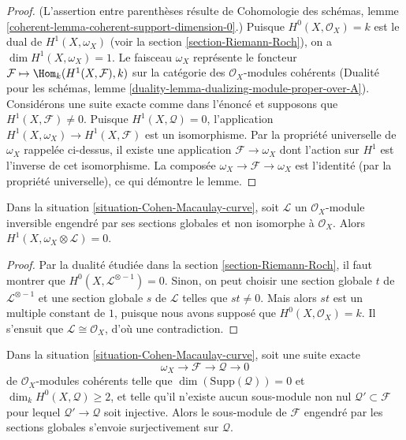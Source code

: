 \begin{proof}
(L'assertion entre parenthèses résulte de Cohomologie des schémas, lemme \ref{coherent-lemma-coherent-support-dimension-0}.) Puisque $H^0(X, \mathcal{O}_X) = k$ est le dual de $H^1(X, \omega_X)$ (voir la section \ref{section-Riemann-Roch}), on a $\dim H^1(X, \omega_X) = 1$. Le faisceau $\omega_X$ représente le foncteur $\mathcal{F} \mapsto \Hom_k(H^1(X, \mathcal{F}), k)$ sur la catégorie des $\mathcal{O}_X$-modules cohérents (Dualité pour les schémas, lemme \ref{duality-lemma-dualizing-module-proper-over-A}). Considérons une suite exacte comme dans l'énoncé et supposons que $H^1(X, \mathcal{F}) \not = 0$. Puisque $H^1(X, \mathcal{Q}) = 0$, l'application $H^1(X, \omega_X) \to H^1(X, \mathcal{F})$ est un isomorphisme. Par la propriété universelle de $\omega_X$ rappelée ci-dessus, il existe une application $\mathcal{F} \to \omega_X$ dont l'action sur $H^1$ est l'inverse de cet isomorphisme. La composée $\omega_X \to \mathcal{F} \to \omega_X$ est l'identité (par la propriété universelle), ce qui démontre le lemme.
\end{proof}

\begin{lemma}
\label{lemma-vanishing-twist}
Dans la situation \ref{situation-Cohen-Macaulay-curve}, soit $\mathcal{L}$ un $\mathcal{O}_X$-module inversible engendré par ses sections globales et non isomorphe à $\mathcal{O}_X$. Alors $H^1(X, \omega_X \otimes \mathcal{L}) = 0$.
\end{lemma}

\begin{proof}
Par la dualité étudiée dans la section \ref{section-Riemann-Roch}, il faut montrer que $H^0(X, \mathcal{L}^{\otimes - 1}) = 0$. Sinon, on peut choisir une section globale $t$ de $\mathcal{L}^{\otimes - 1}$ et une section globale $s$ de $\mathcal{L}$ telles que $st \not = 0$. Mais alors $st$ est un multiple constant de $1$, puisque nous avons supposé que $H^0(X, \mathcal{O}_X) = k$. Il s'ensuit que $\mathcal{L} \cong \mathcal{O}_X$, d'où une contradiction.
\end{proof}

\begin{lemma}
\label{lemma-globally-generated}
Dans la situation \ref{situation-Cohen-Macaulay-curve}, soit une suite exacte $$
\omega_X \to \mathcal{F} \to \mathcal{Q} \to 0
$$ de $\mathcal{O}_X$-modules cohérents telle que $\dim(\text{Supp}(\mathcal{Q})) = 0$ et $\dim_k H^0(X, \mathcal{Q}) \geq 2$, et telle qu'il n'existe aucun sous-module non nul $\mathcal{Q}' \subset \mathcal{F}$ pour lequel $\mathcal{Q}' \to \mathcal{Q}$ soit injective. Alors le sous-module de $\mathcal{F}$ engendré par les sections globales s'envoie surjectivement sur $\mathcal{Q}$.
\end{lemma}

